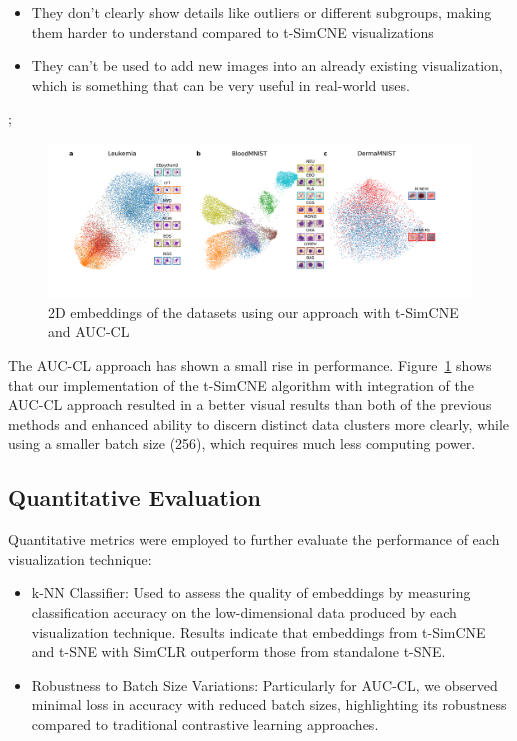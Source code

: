 \begin{itemize}
    \item They don't clearly show details like outliers or different subgroups, making them harder to understand compared to t-SimCNE visualizations
    \item They can't be used to add new images into an already existing visualization, which is something that can be very useful in real-world uses.
\end{itemize};

\begin{figure}[hbt]
\centering
\includegraphics[width=\textwidth]{figs/toy_datasets_long_2.png}
\caption{
2D embeddings of the datasets using our approach with t-SimCNE and AUC-CL
}
\label{fig:tsimcne_auc_cl}
\end{figure}

 The AUC-CL approach has shown a small rise in performance. Figure~\ref{fig:tsimcne_auc_cl} shows that our implementation of the t-SimCNE algorithm with integration of the AUC-CL approach resulted in a better visual results than both of the previous methods and enhanced ability to discern distinct data clusters more clearly, while using a smaller batch size (256), which requires much less computing power.

\subsection{Quantitative Evaluation}

Quantitative metrics were employed to further evaluate the performance of each visualization technique:

\begin{itemize}
    \item {k-NN Classifier}: Used to assess the quality of embeddings by measuring classification accuracy on the low-dimensional data produced by each visualization technique. Results indicate that embeddings from t-SimCNE and t-SNE with SimCLR outperform those from standalone t-SNE.
    \item {Robustness to Batch Size Variations}: Particularly for AUC-CL, we observed minimal loss in accuracy with reduced batch sizes, highlighting its robustness compared to traditional contrastive learning approaches.
\end{itemize}

